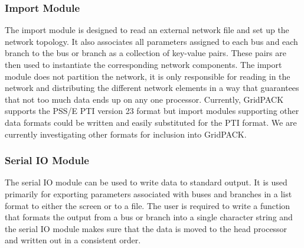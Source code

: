 \documentclass[preprint]{acm_proc_article-sp}
\begin{document}
\subsubsection{Import Module}
The import module is designed to read an external network file and set up the
network topology. It also associates all parameters assigned to each bus and
each branch to the bus or branch as a collection of key-value pairs. These pairs
are then used to instantiate the corresponding network components.
The import module does not partition the network, it is only responsible for reading
in the network and distributing the different network elements in a way that
guarantees that not too much data ends up on any one processor. Currently,
GridPACK supports the PSS/E PTI version 23 format but import modules supporting
other data formats could be written and easily substituted for the PTI format. We
are currently investigating other formats for inclusion into
GridPACK\texttrademark.

\subsubsection{Serial IO Module}
The serial IO module can be used to write data to standard output. It is used
primarily for exporting parameters associated with buses and branches in a list
format to either the screen or to a file. The user is
required to write a function that formats the output from a bus or branch into a
single character string and the serial IO module makes sure that the data is
moved to the head processor and written out in a consistent order.
\end{document}
